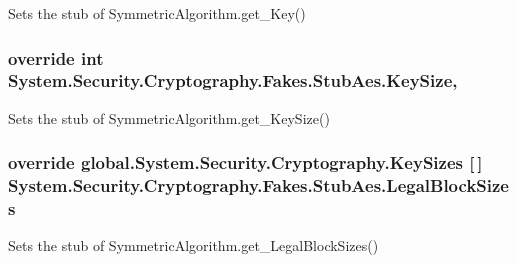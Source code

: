 Sets the stub of Symmetric\-Algorithm.\-get\-\_\-\-Key()

\hypertarget{class_system_1_1_security_1_1_cryptography_1_1_fakes_1_1_stub_aes_a5f745d4ccdbc0be88293aade6b3b1b3a}{
\subsubsection[{Key\-Size}]{\setlength{\rightskip}{0pt plus 5cm}override int System.\-Security.\-Cryptography.\-Fakes.\-Stub\-Aes.\-Key\-Size\hspace{0.3cm}{\ttfamily [get]}, {\ttfamily [set]}}}\label{class_system_1_1_security_1_1_cryptography_1_1_fakes_1_1_stub_aes_a5f745d4ccdbc0be88293aade6b3b1b3a}


Sets the stub of Symmetric\-Algorithm.\-get\-\_\-\-Key\-Size()

\hypertarget{class_system_1_1_security_1_1_cryptography_1_1_fakes_1_1_stub_aes_a62dffcd36e18b376ab18b431f6b54520}{
\subsubsection[{Legal\-Block\-Sizes}]{\setlength{\rightskip}{0pt plus 5cm}override global.\-System.\-Security.\-Cryptography.\-Key\-Sizes \mbox{[}$\,$\mbox{]} System.\-Security.\-Cryptography.\-Fakes.\-Stub\-Aes.\-Legal\-Block\-Sizes\hspace{0.3cm}{\ttfamily [get]}}}\label{class_system_1_1_security_1_1_cryptography_1_1_fakes_1_1_stub_aes_a62dffcd36e18b376ab18b431f6b54520}


Sets the stub of Symmetric\-Algorithm.\-get\-\_\-\-Legal\-Block\-Sizes()

